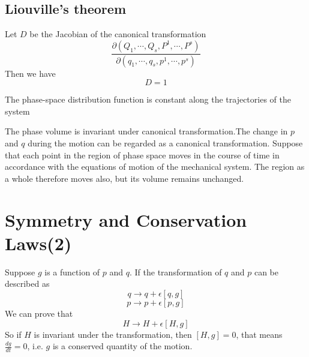 \subsection{Liouville's theorem}
\begin{newlemma}
Let $D$ be the Jacobian of the canonical transformation 
\[\frac{\partial(Q_1,\cdots,Q_s,P^1,\cdots,P^s)}{\partial(q_1,\cdots,q_s,p^1,\cdots,p^s)}\]
Then we have
\[D=1\]
\end{newlemma}

\begin{newthem}
The phase-space distribution function is constant along the trajectories of the system
\end{newthem}

\begin{newproof}
The phase volume is invariant under canonical transformation.The change in $p$ and $q$ during the motion can be regarded as a canonical transformation. Suppose that each point in the region of phase space moves in the course of time in accordance with the equations of motion of the mechanical system. The region as a whole therefore moves also, but its volume remains unchanged.
\end{newproof}

\section{Symmetry and Conservation Laws(2)}
Suppose $g$ is a function of $p$ and $q$. If the transformation of $q$ and $p$ can be described as
\[q \rightarrow q + \epsilon [q,g]\]
\[p \rightarrow p + \epsilon [p,g]\]
We can prove that 
\[H \rightarrow H + \epsilon[H,g]\]
So if $H$ is invariant under the transformation, then $[H,g] = 0$, that means $\frac{dg}{dt} = 0$, i.e. $g$ is a conserved quantity of the motion.

